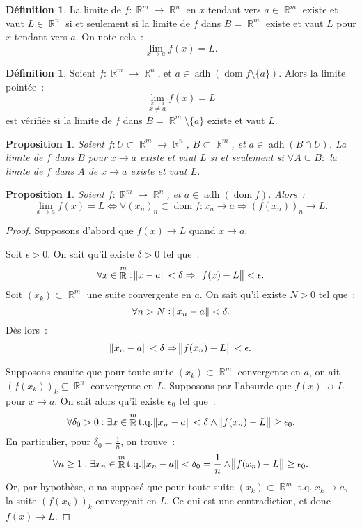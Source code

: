 \documentclass{article}
\DeclareMathOperator{\dom}{dom}
\DeclareMathOperator{\R}{\mathbb R}
\DeclareMathOperator{\adh}{adh}
\DeclareMathOperator{\tq}{ t.q. }
\newtheorem{prp}[thm]{Proposition}
\theoremstyle{definition}
\newtheorem{déf}[thm]{Définition}
\theoremstyle{remark}
\begin{document}
		\begin{déf} La limite de $f : \R^m \to \R^n$ en $x$ tendant vers $a \in \R^m$ existe et vaut $L \in \R^n$ si et seulement si la limite de $f$ dans
		$B = \R^m$ existe et vaut $L$ pour $x$ tendant vers $a$. On note cela~:
		\[\lim_{x \to a}f(x) = L.\]
		\end{déf}

		\begin{déf} Soient $f : \R^m \to \R^n$, et $a \in \adh\left(\dom f \setminus \{a\}\right)$. Alors la limite pointée~:
		\[\lim_{\stackrel {x \to a}{x \neq a}}f(x) = L\]
		est vérifiée si la limite de $f$ dans $B = \R^m \setminus \{a\}$ existe et vaut $L$.
		\end{déf}

		\begin{prp} Soient $f : U \subset \R^m \to \R^n$, $B \subset \R^m$, et $a \in \adh (B \cap U)$. La limite de $f$ dans $B$ pour $x \to a$ existe et vaut
		$L$ si et seulement si $\forall A \subseteq B : $ la limite de $f$ dans $A$ de $x \to a$ existe et vaut $L$.
		\end{prp}

		\begin{prp}\label{prp:limssisuitesconvergent} Soient $f : \R^m \to \R^n$, et $a \in \adh(\dom f)$. Alors~:
		\[\lim_{x \to a}f(x) = L \iff \forall (x_n)_n \subset \dom f : x_n \to a \Rightarrow (f(x_n))_n \to L.\]
		\end{prp}

		\begin{proof} Supposons d'abord que $f(x) \to L$ quand $x \to a$.

		Soit $\epsilon > 0$. On sait qu'il existe $\delta > 0$ tel que~:
		\[\forall x \in \R^m : \norm{x-a} < \delta \Rightarrow \norm{f(x)-L} < \epsilon.\]
		Soit $(x_k) \subset \R^m$ une suite convergente en $a$. On sait qu'il existe $N > 0$ tel que~:
		\[\forall n > N : \norm{x_n-a} < \delta.\]
		Dès lors~:
		\[\norm{x_n-a} < \delta \Rightarrow \norm{f(x_n)-L} < \epsilon.\]

		Supposons ensuite que pour toute suite $(x_k) \subset \R^m$ convergente en $a$, on ait $(f(x_k))_k \subseteq \R^n$ convergente en $L$.
		Supposons par l'absurde que $f(x) \not \to L$ pour $x \to a$. On sait alors qu'il existe $\epsilon_0$ tel que~:
		\[\forall \delta_0 > 0 : \exists x \in \R^m \tq \norm{x_n-a} < \delta \land \norm{f(x_n)-L} \geq \epsilon_0.\]
		En particulier, pour $\delta_0 = \frac 1n$, on trouve~:
		\[\forall n \geq 1 : \exists x_n \in \R^m \tq \norm{x_n-a} < \delta_0 = \frac 1n \land \norm{f(x_n)-L} \geq \epsilon_0.\]
		Or, par hypothèse, o na supposé que pour toute suite $(x_k) \subset \R^m \tq x_k \to a$, la suite $(f(x_k))_k$ convergeait en $L$.
		Ce qui est une contradiction, et donc $f(x) \to L$.
		\end{proof}
\end{document}
